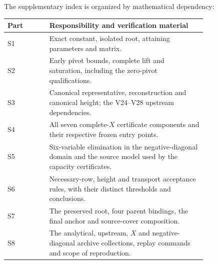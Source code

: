 \documentclass[11pt,reqno]{amsart}
\theoremstyle{definition}
\theoremstyle{remark}
\begin{document}
The supplementary index is organized by mathematical dependency:
\begin{center}
\begin{tabular}{@{}lp{0.79\linewidth}@{}}
\toprule
Part & Responsibility and verification material \\
\midrule
S1 & Exact constant, isolated root, attaining parameters and matrix.\\
S2 & Early pivot bounds, complete lift and saturation, including
      the zero-pivot qualifications.\\
S3 & Canonical representative, reconstruction and canonical height;
      the V24--V28 upstream dependencies.\\
S4 & All seven complete-\(X\) certificate components and their
      respective frozen entry points.\\
S5 & Six-variable elimination in the negative-diagonal domain and
      the source model used by the capacity certificates.\\
S6 & Necessary-row, height and transport acceptance rules, with
      their distinct thresholds and conclusions.\\
S7 & The preserved root, four parent bindings, the final anchor and
      source-cover composition.\\
S8 & The analytical, upstream, \(X\) and negative-diagonal archive
      collections, replay commands and scope of reproduction.\\
\bottomrule
\end{tabular}
\end{center}
\end{document}
